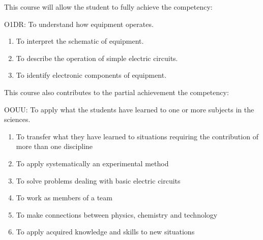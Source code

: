 {This course will allow the student to fully achieve the competency:

O1DR:  To understand how equipment operates.
\begin{enumerate}
\item To interpret the schematic of equipment.
\item To describe the operation of simple electric circuits.
\item To identify electronic components of equipment.
\end{enumerate}
\smallskip
This course also contributes to the partial achievement the competency:

OOUU:	To apply what the students have learned to one or more subjects in the sciences.

\begin{enumerate}
\item To transfer what they have learned to situations requiring the contribution of more than one discipline
\item To apply systematically an experimental method
\item To solve problems dealing with basic electric circuits
\item To work as members of a team
\item To make connections between physics, chemistry and technology
\item To apply acquired knowledge and skills to new situations
\end{enumerate}
}